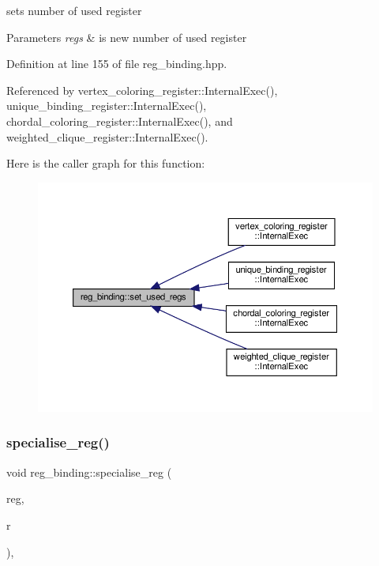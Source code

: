 sets number of used register 


\begin{DoxyParams}{Parameters}
{\em regs} & is new number of used register \\
\hline
\end{DoxyParams}


Definition at line 155 of file reg\+\_\+binding.\+hpp.



Referenced by vertex\+\_\+coloring\+\_\+register\+::\+Internal\+Exec(), unique\+\_\+binding\+\_\+register\+::\+Internal\+Exec(), chordal\+\_\+coloring\+\_\+register\+::\+Internal\+Exec(), and weighted\+\_\+clique\+\_\+register\+::\+Internal\+Exec().

Here is the caller graph for this function\+:
\nopagebreak
\begin{figure}[H]
\begin{center}
\leavevmode
\includegraphics[width=350pt]{da/d7c/classreg__binding_a9148072d5c10c39562d8e63e17cf2ccb_icgraph}
\end{center}
\end{figure}
\mbox{\label{classreg__binding_a3b84d34513f28b85ddbd578b2d0ce191}} 
\subsubsection{\texorpdfstring{specialise\+\_\+reg()}{specialise\_reg()}}
{\footnotesize\ttfamily void reg\+\_\+binding\+::specialise\+\_\+reg (\begin{DoxyParamCaption}\item[{\hyperlink{structural__objects_8hpp_a8ea5f8cc50ab8f4c31e2751074ff60b2}{structural\+\_\+object\+Ref} \&}]{reg,  }\item[{unsigned int}]{r }\end{DoxyParamCaption})\hspace{0.3cm}{\ttfamily [protected]}, {\ttfamily [virtual]}}



